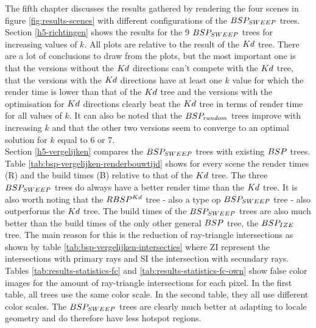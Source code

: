 The fifth chapter discusses the results gathered by rendering the four scenes in figure \ref{fig:results-scenes} with different configurations of the $BSP_{SWEEP}$ trees.
Section \ref{h5-richtingen} shows the results for the 9 $BSP_{SWEEP}$ trees for increasing values of $k$.
All plots are relative to the result of the $Kd$ tree.
There are a lot of conclusions to draw from the plots, but the most important one is that the versions without the $Kd$ directions can't compete with the $Kd$ tree, that the versions with the $Kd$ directions have at least one $k$ value for which the render time is lower than that of the $Kd$ tree and the versions with the optimisation for $Kd$ directions clearly beat the $Kd$ tree in terms of render time for all values of $k$.
It can also be noted that the $BSP_{random}$ trees improve with increasing $k$ and that the other two versions seem to converge to an optimal solution for $k$ equal to 6 or 7.\\

Section \ref{h5-vergelijken} compares the $BSP_{SWEEP}$ trees with existing $BSP$ trees.
Table \ref{tab:bsp-vergelijken-renderbouwtijd} shows for every scene the render times (R) and the build times (B) relative to that of the $Kd$ tree.
The three $BSP_{SWEEP}$ trees do always have a better render time than the $Kd$ tree.
It is also worth noting that the $RBSP^{Kd}$ tree - also a type op $BSP_{SWEEP}$ tree - also outperforms the $Kd$ tree.
The build times of the $BSP_{SWEEP}$ trees are also much better than the build times of the only other general $BSP$ tree, the $BSP_{IZE}$ tree. The main reason for this is the reduction of ray-triangle intersections as shown by table \ref{tab:bsp-vergelijken-intersecties} where ZI represent the intersections with primary rays and SI the intersection with secundary rays.
Tables \ref{tab:results-statistics-fc} and \ref{tab:results-statistics-fc-own} show false color images for the amount of ray-triangle intersections for each pixel. In the first table, all trees use the same color scale. In the second table, they all use different color scales. 
The $BSP_{SWEEP}$ trees are clearly much better at adapting to locale geometry and do therefore have less hotspot regions.\\

